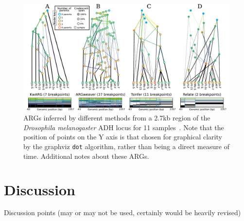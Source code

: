 \documentclass{article}
\begin{document}
\begin{figure}
\begin{center}
    \includegraphics[width=\textwidth]{illustrations/inference.pdf}
\end{center}
\caption{\label{fig-inferred-args}
ARGs inferred by different methods from a 2.7kb region of the \textit{Drosophila melanogaster}
ADH locus for 11 samples~\citep{kreitman1983nucleotide}. Note that the position of points on the
Y axis is that chosen for graphical clarity by the graphviz \texttt{dot} algorithm,  rather than being
a direct measure of time. Additional notes about these ARGs.
}
\end{figure}

\section*{Discussion}

Discussion points (may or may not be used, certainly would be heavily revised)
\end{document}
